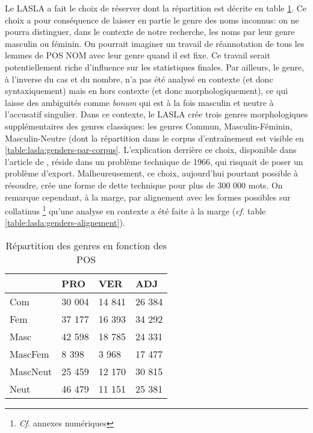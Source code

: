 \newpara

Le LASLA a fait le choix de réserver   \cite[p.~27]{BodsonCodification1966} dont la répartition est décrite en table \ref{table:lasla:genders-par-pos}. Ce choix a pour conséquence de laisser en partie le genre des noms inconnus: on ne pourra distinguer, dans le contexte de notre recherche, les noms par leur genre masculin ou féminin. On pourrait imaginer un travail de réannotation de tous les lemmes de POS NOM avec leur genre quand il est fixe. Ce travail serait potentiellement riche d'influence sur les statistiques finales. Par ailleurs, le genre, à l'inverse du cas et du nombre, n'a pas été analysé en contexte (et donc syntaxiquement) mais en hors contexte (et donc morphologiquement), ce qui laisse des ambiguités comme \textit{bonum} qui est à la fois masculin et neutre à l'accusatif singulier. Dans ce contexte, le LASLA crée trois genres morphologiques supplémentaires des genres classiques: les genres Commun, Masculin-Féminin, Masculin-Neutre (dont la répartition dans le corpus d'entraînement est visible en \ref{table:lasla:genders-par-corpus}. L'explication derrière ce choix, disponible dans l'article de \citep{BodsonCodification1966}, réside dans un problème technique de 1966, qui risquait de poser un problème d'export. Malheureusement, ce choix, aujourd'hui pourtant possible à résoudre, crée une forme de dette technique pour plus de 300 000 mots. On remarque cependant, à la marge, par alignement avec les formes possibles sur collatinus \footnote{\textit{Cf.} annexes numériques} qu'une analyse en contexte a été faite à la marge (\textit{cf.} table \ref{table:lasla:genders-alignement}).

\begin{table}[]
\centering
\begin{tabular}{l|lll}
\toprule
         & PRO    & VER    & ADJ    \\ \midrule
Com      & 30 004 & 14 841 & 26 384 \\
Fem      & 37 177 & 16 393 & 34 292 \\
Masc     & 42 598 & 18 785 & 24 331 \\
MascFem  & 8 398  & 3 968  & 17 477 \\
MascNeut & 25 459 & 12 170 & 30 815 \\
Neut     & 46 479 & 11 151 & 25 381 \\ \bottomrule
\end{tabular}
\label{table:lasla:genders-par-pos}
\caption{Répartition des genres en fonction des POS}
\end{table}

